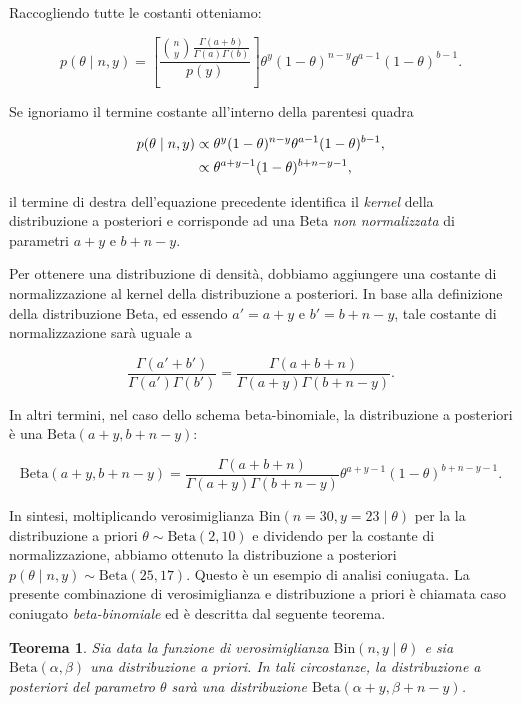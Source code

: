\documentclass[
  11pt,
]{krantz}
\newtheorem{theorem}{Teorema}[chapter]
\theoremstyle{definition}
\theoremstyle{definition}
\theoremstyle{definition}
\theoremstyle{definition}
\theoremstyle{remark}
\begin{document}
Raccogliendo tutte le costanti otteniamo:

\[
p(\theta \mid n, y) =\left[\frac{\binom{n}{y}\frac{\Gamma(a+b)}{\Gamma(a)\Gamma(b)}}{p(y)}\right] \theta^{y}(1-\theta)^{n-y}\theta^{a-1} (1-\theta)^{b-1}.
\]

Se ignoriamo il termine costante all'interno della parentesi quadra

\begin{align}
p(\theta \mid n, y) &\propto \theta^{y}(1-\theta)^{n-y}\theta^{a-1} (1-\theta)^{b-1},\notag\\
&\propto \theta^{a+y-1}(1-\theta)^{b+n-y-1},\notag
\end{align}

il termine di destra dell'equazione precedente identifica il \emph{kernel} della distribuzione a posteriori e corrisponde ad una Beta \emph{non normalizzata} di parametri \(a + y\) e \(b + n - y\).

Per ottenere una distribuzione di densità, dobbiamo aggiungere una costante di normalizzazione al kernel della distribuzione a posteriori. In base alla definizione della distribuzione Beta, ed essendo \(a' = a+y\) e \(b' = b+n-y\), tale costante di normalizzazione sarà uguale a

\[
\frac{\Gamma(a'+b')}{\Gamma(a')\Gamma(b')} = \frac{\Gamma(a+b+n)}{\Gamma(a+y)\Gamma(b+n-y)}.
\]

In altri termini, nel caso dello schema beta-binomiale, la distribuzione a posteriori è una \(\mbox{Beta}(a+y, b+n-y)\):

\[
\mbox{Beta}(a+y, b+n-y) = \frac{\Gamma(a+b+n)}{\Gamma(a+y)\Gamma(b+n-y)} \theta^{a+y-1}(1-\theta)^{b+n-y-1}.
\]

In sintesi, moltiplicando verosimiglianza \(\mbox{Bin}(n = 30, y = 23 \mid \theta)\) per la la distribuzione a priori \(\theta \sim \mbox{Beta}(2, 10)\) e dividendo per la costante di normalizzazione, abbiamo ottenuto la distribuzione a posteriori \(p(\theta \mid n, y) \sim \mbox{Beta}(25, 17)\). Questo è un esempio di analisi coniugata. La presente combinazione di verosimiglianza e distribuzione a priori è chiamata caso coniugato \emph{beta-binomiale} ed è descritta dal seguente teorema.

\begin{theorem}
\protect\hypertarget{thm:post-beta-bin-1}{}\label{thm:post-beta-bin-1}Sia data la funzione di verosimiglianza \(\mbox{Bin}(n, y \mid \theta)\) e sia \(\mbox{Beta}(\alpha, \beta)\) una distribuzione a priori. In tali circostanze, la distribuzione a posteriori del parametro \(\theta\) sarà una distribuzione \(\mbox{Beta}(\alpha + y, \beta + n - y)\).
\end{theorem}
\end{document}
